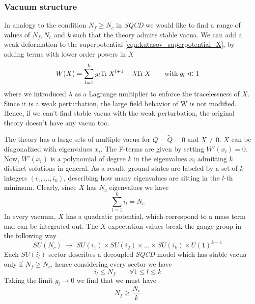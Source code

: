 \subsubsection{Vacuum structure}

In analogy to the condition $N_f \geq N_c$ in \emph{SQCD} we would like to find a range of values of $N_f,N_c$ and $k$ such that the theory admits stable vacua.  
We can add a weak deformation to the superpotential \eqref{eqn:kutasov_superpotential_X}, by adding terms with lower order powers in $X$
\begin{equation}
W(X) = \sum_{l=1}^k g_l  \mathrm{Tr } \, X^{l+1} + \lambda \mathrm{Tr } \, X \qquad \hbox{with} \; g_l \ll 1
\label{eqn:kutasov_deformed_superpotential}
\end{equation}
where we introduced $\lambda$ as a Lagrange multiplier to enforce the tracelessness of $X$.
Since it is a weak perturbation, the large field behavior of W is not modified.
Hence, if we can't find stable vacua with the weak perturbation, the original theory doesn't have any vacua too. 

The theory has a large sets of multiple vacua for $Q=\tilde{Q} = 0$ and $X \neq 0 $. 
$X$ can be diagonalized with eigenvalues $x_i$.
The F-terms are given by setting $W'(x_i) = 0$. 
Now, $W'(x_i)$ is a polynomial of degree $k$ in the eigenvalues $x_i$ admitting $k$ distinct solutions in general. 
As a result, ground states are labeled by a set of $k$ integers $(i_1, \dotsc, i_k)$, describing how many eigenvalues are sitting in the $l$-th minimum. Clearly, since $X$ has $N_c$ eigenvalues we have 
\begin{equation}
 \sum_{l=1}^k i_l = N_c
\end{equation}
In every vacuum, $X$ has a quadratic potential, which correspond to a mass term and can be integrated out.
The $X$ expectation values break the gauge group in the following way
\begin{equation}
	SU(N_c) \; \longrightarrow \; SU(i_1) \times SU(i_2) \times \dots \times SU(i_k) \times U(1)^{k-1}
\end{equation}
Each $SU({i_l})$ sector describes a decoupled \emph{SQCD} model which has stable vacua only if $N_f \geq N_c$, hence considering every sector we have 
\begin{equation}
i_l \leq N_f \qquad \forall 1 \leq l \leq k
\end{equation}
Taking the limit $g_l \rightarrow 0$ we find that we must have
\begin{equation}
 N_f \geq \frac{N_c}{k}
\end{equation}

